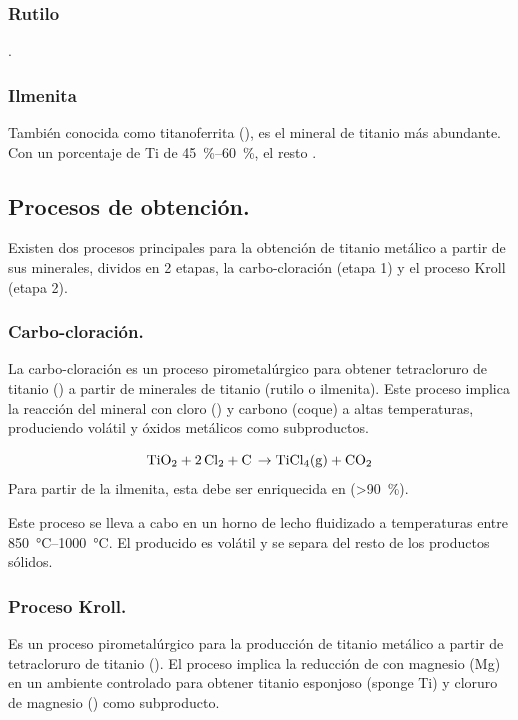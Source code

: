 \documentclass[12pt,a4paper]{article}
\begin{document}
\subsubsection{Rutilo}

.

\subsubsection{Ilmenita} 

También conocida como titanoferrita (), es el mineral de titanio más abundante. Con un porcentaje de Ti de \SIrange[range-phrase = { - }, range-units=single]{45}{60}{\percent}, el resto .

\subsection{Procesos de obtención.}

Existen dos procesos principales para la obtención de titanio metálico a partir de sus minerales, dividos en 2 etapas, la carbo-cloración (etapa 1) y el proceso Kroll (etapa 2).

\subsubsection{Carbo-cloración.}

La carbo-cloración es un proceso pirometalúrgico para obtener tetracloruro de titanio () a partir de minerales de titanio (rutilo o ilmenita). Este proceso implica la reacción del mineral con cloro () y carbono (coque) a altas temperaturas, produciendo  volátil y óxidos metálicos como subproductos.

\[ \ce{TiO2 + 2Cl2 + C \rightarrow TiCl4(g) + CO2}\]
Para partir de la ilmenita, esta debe ser enriquecida en  (\SI{>90}{\percent}).

Este proceso se lleva a cabo en un horno de lecho fluidizado a temperaturas entre \SIrange[range-phrase = { - }, range-units=single]{850}{1000}{\celsius}. El  producido es volátil y se separa del resto de los productos sólidos.

\subsubsection{Proceso Kroll.}

Es un proceso pirometalúrgico para la producción de titanio metálico a partir de tetracloruro de titanio (). El proceso implica la reducción de  con magnesio (Mg) en un ambiente controlado para obtener titanio esponjoso (sponge Ti) y cloruro de magnesio () como subproducto.
\end{document}
